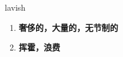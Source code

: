 
\begin{frame}
{\huge lavish}
\begin{center}
\begin{enumerate}\Large
  \item \textbf{奢侈的，大量的，无节制的}
  \item \textbf{挥霍，浪费}
\end{enumerate}
\end{center}
\end{frame}
